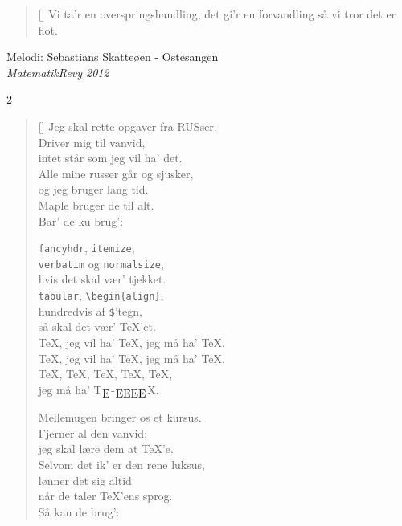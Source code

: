 {{\begin{multicols}
\begin{verse}[\versewidth]
Vi ta'r en overspringshandling, det gi'r en forvandling
så vi tror det er flot.


\end{verse}
\end{multicols}
}

\newpage


{Melodi: Sebastians Skatteøen - Ostesangen}\\[.2em]
{\small\itshape MatematikRevy 2012}

\begin{multicols}2
\settowidth{\versewidth}{\TeX, jeg vil ha' \TeX, jeg må ha' \TeX.}
\begin{verse}[\versewidth]
Jeg skal rette opgaver fra RUSser.\\
Driver mig til vanvid,\\
intet står som jeg vil ha' det.\\
Alle mine russer går og sjusker,\\
og jeg bruger lang tid.\\
Maple bruger de til alt.\\
Bar' de ku brug':

\verb|fancyhdr|, \verb|itemize|,\\
\verb|verbatim| og \verb|normalsize|,\\
hvis det skal vær' tjekket.\\
\verb|tabular|, \verb|\begin{align}|,\\
hundredvis af \verb|$|'tegn,\\
så skal det vær' \TeX'et.\\
\TeX, jeg vil ha' \TeX, jeg må ha' \TeX.\\
\TeX, jeg vil ha' \TeX, jeg må ha' \TeX.\\
\TeX, \TeX, \TeX, \TeX, \TeX,\\
jeg må ha' T\!$_{\text{\normalsize E}}$-$_{\text{\normalsize EEEE}}$\!X.

\columnbreak
Mellemugen bringer os et kursus.\\
Fjerner al den vanvid;\\
jeg skal lære dem at \TeX'e.\\
Selvom det ik' er den rene luksus,\\
lønner det sig altid\\
når de taler \TeX'ens sprog.\\
Så kan de brug':


\end{verse}
\end{multicols}}
